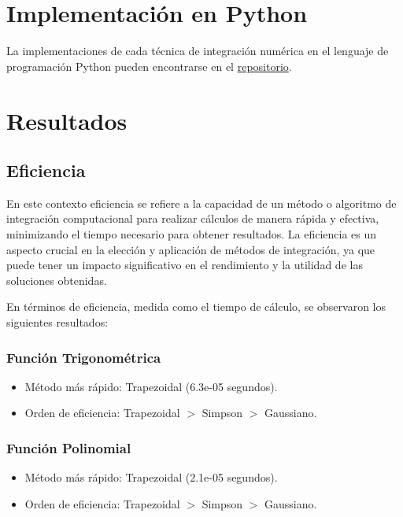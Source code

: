 \documentclass[a4paper]{article}
\begin{document}
    \section{Implementación en Python}
	\label{sec:python}
    La implementaciones de cada técnica de integración numérica en el lenguaje de 
    programación Python pueden encontrarse en el \href{https://github.com/nicolasgomeza7/tecnicasIntegracion}{repositorio}.
    
    \section{Resultados}    
    
    \subsection{Eficiencia}

    En este contexto eficiencia se refiere a la capacidad de un método o algoritmo de integración computacional para realizar cálculos de manera rápida y efectiva, minimizando el tiempo necesario para obtener resultados. La eficiencia es un aspecto crucial en la elección y aplicación de métodos de integración, ya que puede tener un impacto significativo en el rendimiento y la utilidad de las soluciones obtenidas.
    
    En términos de eficiencia, medida como el tiempo de cálculo, se observaron los siguientes resultados:
    
   \subsubsection{Función Trigonométrica}
    \begin{itemize}
        \item Método más rápido: Trapezoidal (6.3e-05 segundos).
        \item Orden de eficiencia: Trapezoidal $>$ Simpson $>$ Gaussiano.
    \end{itemize}
    
    \subsubsection{Función Polinomial}
    \begin{itemize}
        \item Método más rápido: Trapezoidal (2.1e-05 segundos).
        \item Orden de eficiencia: Trapezoidal $>$ Simpson $>$ Gaussiano.
    \end{itemize}
    
\end{document}
